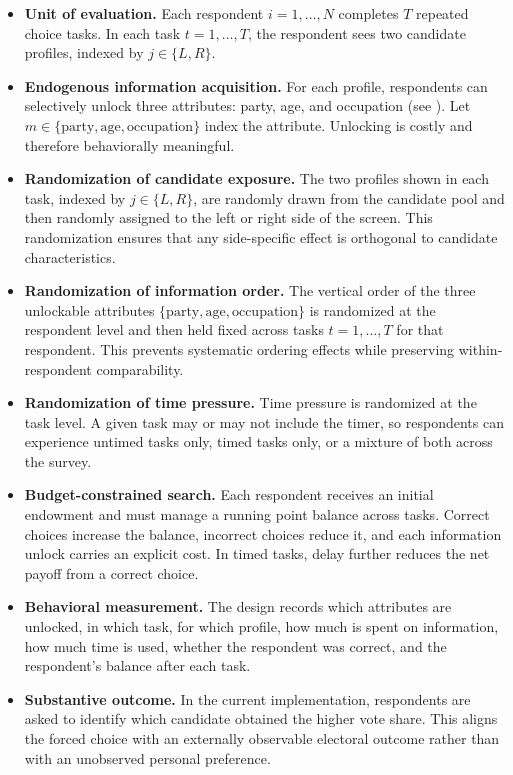 \documentclass[11pt]{article}
\begin{document}
\begin{itemize}
    \item \textbf{Unit of evaluation.} Each respondent $i=1,\dots,N$ completes $T$ repeated choice tasks. In each task $t=1,\dots,T$, the respondent sees two candidate profiles, indexed by $j \in \{L,R\}$.

    \item \textbf{Endogenous information acquisition.} For each profile, respondents can selectively unlock three attributes: party, age, and occupation (see \cite{Bahamonde2024}). Let $m \in \{\text{party}, \text{age}, \text{occupation}\}$ index the attribute. Unlocking is costly and therefore behaviorally meaningful.

    \item \textbf{Randomization of candidate exposure.} The two profiles shown in each task, indexed by $j \in \{L,R\}$, are randomly drawn from the candidate pool and then randomly assigned to the left or right side of the screen. This randomization ensures that any side-specific effect is orthogonal to candidate characteristics.

    \item \textbf{Randomization of information order.} The vertical order of the three unlockable attributes $\{\text{party}, \text{age}, \text{occupation}\}$ is randomized at the respondent level and then held fixed across tasks $t=1,\dots,T$ for that respondent. This prevents systematic ordering effects while preserving within-respondent comparability.

    \item \textbf{Randomization of time pressure.} Time pressure is randomized at the task level. A given task may or may not include the timer, so respondents can experience untimed tasks only, timed tasks only, or a mixture of both across the survey.

    \item \textbf{Budget-constrained search.} Each respondent receives an initial endowment and must manage a running point balance across tasks. Correct choices increase the balance, incorrect choices reduce it, and each information unlock carries an explicit cost. In timed tasks, delay further reduces the net payoff from a correct choice.

    \item \textbf{Behavioral measurement.} The design records which attributes are unlocked, in which task, for which profile, how much is spent on information, how much time is used, whether the respondent was correct, and the respondent's balance after each task.

    \item \textbf{Substantive outcome.} In the current implementation, respondents are asked to identify which candidate obtained the higher vote share. This aligns the forced choice with an externally observable electoral outcome rather than with an unobserved personal preference.
\end{itemize}
\end{document}
